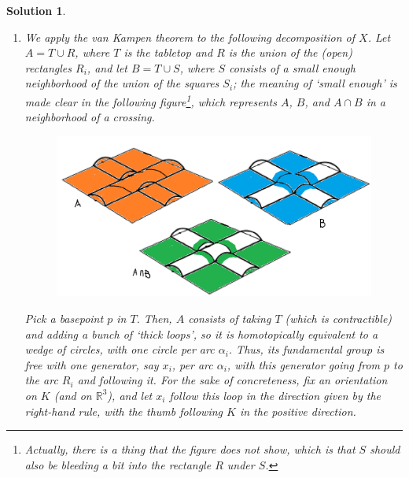 \documentclass{article}
\theoremstyle{plain}
\theoremstyle{nonumberplain}
\newtheorem{sol}{Solution}
\newcommand{\R}{\mathbb{R}}
\begin{document}
\begin{sol}
\leavevmode
\begin{enumerate}
\item We apply the van Kampen theorem to the following decomposition of $X$. Let $A = T \cup R$, where $T$ is the tabletop and $R$ is the union of the (open) rectangles $R_i$, and let $B = T \cup S$, where $S$ consists of a small enough neighborhood of the union of the squares $S_i$; the meaning of `small enough' is made clear in the following figure\footnote{Actually, there is a thing that the figure does not show, which is that $S$ should also be bleeding a bit into the rectangle $R$ under $S$.}, which represents $A$, $B$, and $A \cap B$ in a neighborhood of a crossing.
\begin{figure}[H]
\centering
\includegraphics[width=\linewidth]{knot1}
\end{figure}

Pick a basepoint $p$ in $T$. Then, $A$ consists of taking $T$ (which is contractible) and adding a bunch of `thick loops', so it is homotopically equivalent to a wedge of circles, with one circle per arc $\alpha_i$. Thus, its fundamental group is free with one generator, say $x_i$, per arc $\alpha_i$, with this generator going from $p$ to the arc $R_i$ and following it. For the sake of concreteness, \emph{fix an orientation on $K$} (and on $\R^3$), and let $x_i$ follow this loop in the direction given by the right-hand rule, with the thumb following $K$ in the positive direction.


\end{enumerate}
\end{sol}
\end{document}
